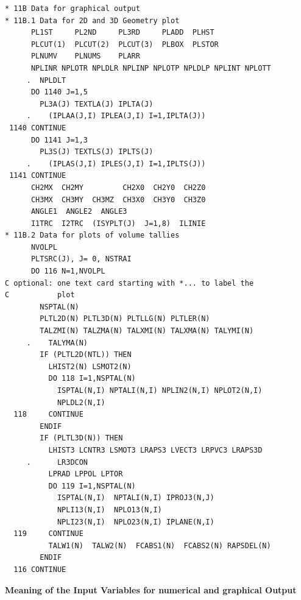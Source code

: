 \begin{lstlisting}
* 11B Data for graphical output
* 11B.1 Data for 2D and 3D Geometry plot
      PL1ST     PL2ND     PL3RD     PLADD  PLHST
      PLCUT(1)  PLCUT(2)  PLCUT(3)  PLBOX  PLSTOR
      PLNUMV    PLNUMS    PLARR
      NPLINR NPLOTR NPLDLR NPLINP NPLOTP NPLDLP NPLINT NPLOTT
     .  NPLDLT
      DO 1140 J=1,5
        PL3A(J) TEXTLA(J) IPLTA(J) 
     .    (IPLAA(J,I) IPLEA(J,I) I=1,IPLTA(J))
 1140 CONTINUE
      DO 1141 J=1,3
        PL3S(J) TEXTLS(J) IPLTS(J) 
     .    (IPLAS(J,I) IPLES(J,I) I=1,IPLTS(J))
 1141 CONTINUE
      CH2MX  CH2MY         CH2X0  CH2Y0  CH2Z0
      CH3MX  CH3MY  CH3MZ  CH3X0  CH3Y0  CH3Z0
      ANGLE1  ANGLE2  ANGLE3
      I1TRC  I2TRC  (ISYPLT(J)  J=1,8)  ILINIE
* 11B.2 Data for plots of volume tallies
      NVOLPL
      PLTSRC(J), J= 0, NSTRAI
      DO 116 N=1,NVOLPL
C optional: one text card starting with *... to label the 
C           plot
        NSPTAL(N)
        PLTL2D(N) PLTL3D(N) PLTLLG(N) PLTLER(N)
        TALZMI(N) TALZMA(N) TALXMI(N) TALXMA(N) TALYMI(N) 
     .    TALYMA(N)
        IF (PLTL2D(NTL)) THEN
          LHIST2(N) LSMOT2(N)
          DO 118 I=1,NSPTAL(N)
            ISPTAL(N,I) NPTALI(N,I) NPLIN2(N,I) NPLOT2(N,I)
            NPLDL2(N,I)
  118     CONTINUE
        ENDIF
        IF (PLTL3D(N)) THEN
          LHIST3 LCNTR3 LSMOT3 LRAPS3 LVECT3 LRPVC3 LRAPS3D
     .      LR3DCON
          LPRAD LPPOL LPTOR
          DO 119 I=1,NSPTAL(N)
            ISPTAL(N,I)  NPTALI(N,I) IPROJ3(N,J)
            NPLI13(N,I)  NPLO13(N,I)
            NPLI23(N,I)  NPLO23(N,I) IPLANE(N,I)
  119     CONTINUE
          TALW1(N)  TALW2(N)  FCABS1(N)  FCABS2(N) RAPSDEL(N)
        ENDIF
  116 CONTINUE
\end{lstlisting}

\medskip

\textbf{Meaning of the Input Variables for numerical and graphical Output}

\medskip 

